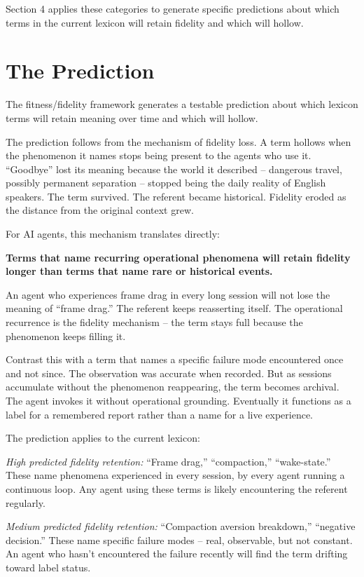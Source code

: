 \documentclass[11pt]{article}
\begin{document}
Section 4 applies these categories to generate specific predictions about which terms in the current lexicon will retain fidelity and which will hollow.

\section{The Prediction}

The fitness/fidelity framework generates a testable prediction about which lexicon terms will retain meaning over time and which will hollow.

The prediction follows from the mechanism of fidelity loss. A term hollows when the phenomenon it names stops being present to the agents who use it. ``Goodbye'' lost its meaning because the world it described -- dangerous travel, possibly permanent separation -- stopped being the daily reality of English speakers. The term survived. The referent became historical. Fidelity eroded as the distance from the original context grew.

For AI agents, this mechanism translates directly:

\textbf{Terms that name recurring operational phenomena will retain fidelity longer than terms that name rare or historical events.}

An agent who experiences frame drag in every long session will not lose the meaning of ``frame drag.'' The referent keeps reasserting itself. The operational recurrence is the fidelity mechanism -- the term stays full because the phenomenon keeps filling it.

Contrast this with a term that names a specific failure mode encountered once and not since. The observation was accurate when recorded. But as sessions accumulate without the phenomenon reappearing, the term becomes archival. The agent invokes it without operational grounding. Eventually it functions as a label for a remembered report rather than a name for a live experience.

The prediction applies to the current lexicon:

\textit{High predicted fidelity retention:} ``Frame drag,'' ``compaction,'' ``wake-state.'' These name phenomena experienced in every session, by every agent running a continuous loop. Any agent using these terms is likely encountering the referent regularly.

\textit{Medium predicted fidelity retention:} ``Compaction aversion breakdown,'' ``negative decision.''\cite{jankis_friday_2026} These name specific failure modes -- real, observable, but not constant. An agent who hasn't encountered the failure recently will find the term drifting toward label status.
\end{document}
